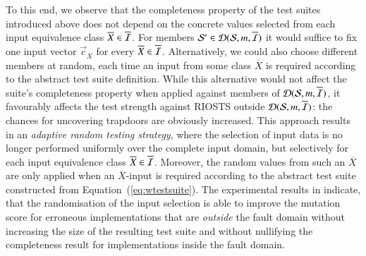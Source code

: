 To this end, we observe that the completeness property of the test suites introduced 
above does not depend on the concrete values selected from each input equivalence 
class $\overline{X}\in \overline{{\cal I}}$. For members ${\cal S}'\in {\cal D}({\cal S},m,\overline{{\cal I}})$ it would suffice to fix one input vector 
$\vec c_{\overline{X}}$ for every
$\overline{X}\in \overline{{\cal I}}$. Alternatively, we could also choose different members at random,
each time an input from some class $\overline{X}$ 
is required according to the abstract test suite
definition.
While this alternative would not affect the suite's completeness property
when applied against members of ${\cal D}({\cal S},m,\overline{{\cal I}})$,
it favourably affects the test strength against RIOSTS outside 
${\cal D}({\cal S},m,\overline{{\cal I}})$: the chances for uncovering trapdoors
are obviously increased. This approach results in an 
\emph{adaptive random testing strategy}, where the selection of input data is no longer 
performed uniformly over the complete input domain, but selectively for each input equivalence
class $\overline{X}\in \overline{{\cal I}}$. Moreover, the random values from such 
an $\overline{X}$ are only applied when an $\overline{X}$-input is required according to the 
abstract test suite constructed from Equation~(\ref{eq:wtestsuite}). The experimental results in
\cite{huebner15} indicate, that the randomisation of the input selection is able to improve the 
mutation score for erroneous implementations that are {\it outside} the fault domain without increasing
the size of the resulting test suite and without nullifying the completeness result for 
implementations inside the fault domain.
  



